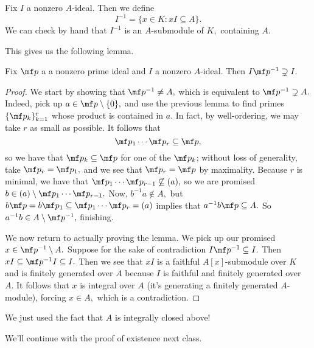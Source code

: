 \documentclass[../notes.tex]{subfiles}
\begin{document}
\begin{defi}
    Fix $I$ a nonzero $A$-ideal. Then we define
    \[I^{-1}=\{x\in K:xI\subseteq A\}.\]
    We can check by hand that $I^{-1}$ is an $A$-submodule of $K,$ containing $A.$
\end{defi}
This gives us the following lemma.
\begin{lem}
    Fix $\mf p$ a a nonzero prime ideal and $I$ a nonzero $A$-ideal. Then $I\mf p^{-1}\supsetneq I.$
\end{lem}
\begin{proof}
    We start by showing that $\mf p^{-1}\ne A,$ which is equivalent to $\mf p^{-1}\supsetneq A.$ Indeed, pick up $a\in\mf p\setminus\{0\},$ and use the previous lemma to find primes $\{\mf p_k\}_{k=1}^r$ whose product is contained in $a.$ In fact, by well-ordering, we may take $r$ as small as possible. It follows that
    \[\mf p_1\cdots\mf p_r\subseteq\mf p,\]
    so we have that $\mf p_k\subseteq\mf p$ for one of the $\mf p_k$; without loss of generality, take $\mf p_r=\mf p_1,$ and we see that $\mf p_r=\mf p$ by maximality. Because $r$ is minimal, we have that $\mf p_1\cdots\mf p_{r-1}\not\subseteq(a),$ so we are promised $b\in(a)\setminus\mf p_1\cdots\mf p_{r-1}.$ Now, $b^{-1}a\notin A,$ but $b\mf p=b\mf p_1\subseteq\mf p_1\cdots\mf p_r=(a)$ implies that $a^{-1}b\mf p\subseteq A.$ So $a^{-1}b\in A\setminus\mf p^{-1},$ finishing.
    
    We now return to actually proving the lemma. We pick up our promised $x\in\mf p^{-1}\setminus A.$ Suppose for the sake of contradiction $I\mf p^{-1}\subseteq I.$ Then $xI\subseteq\mf p^{-1}I\subseteq I.$ Then we see that $xI$ is a faithful $A[x]$-submodule over $K$ and is finitely generated over $A$ because $I$ is faithful and finitely generated over $A.$ It follows that $x$ is integral over $A$ (it's generating a finitely generated $A$-module), forcing $x\in A,$ which is a contradiction.
\end{proof}
\begin{remark}
    We just used the fact that $A$ is integrally closed above!
\end{remark}
We'll continue with the proof of existence next class.
\end{document}
